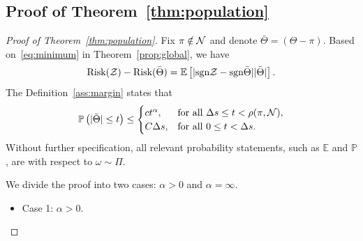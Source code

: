 \documentclass[twoside,11pt]{article}
\theoremstyle{definition}
\def\sign{\textup{sgn}}
\def\risk{\textup{Risk}}
\begin{document}
\subsection{Proof of Theorem~\ref{thm:population}}
\begin{proof}[Proof of Theorem~\ref{thm:population}]
Fix $\pi\notin\mathcal{N}$ and denote $\bar \Theta=(\Theta-\pi)$. Based on~\eqref{eq:minimum} in Theorem~\ref{prop:global}, we have
\begin{equation}\label{eq:population2}
\risk(\tZ)- \risk(\bar \Theta) = \mathbb{E}\left[|\sign \tZ-\sign\bar \Theta||\bar \Theta|\right].
\end{equation}
The Definition~\ref{ass:margin} states that
\begin{align}\label{eq:ass}
\mathbb{P}\left(|\bar \Theta | \leq t\right) \leq 
\begin{cases}ct^\alpha, & \text{for all } \Delta s \leq t< \rho(\pi,\mathcal{N}),\\
C\Delta s, & \text{for all }0\leq t< \Delta s.
\end{cases}
\end{align}
Without further specification, all relevant probability statements, such as $\mathbb{E}$ and $\mathbb{P}$, are with respect to $\omega\sim \Pi$. 

We divide the proof into two cases: $\alpha >0$ and $\alpha = \infty$.
\begin{itemize}[leftmargin=*,topsep=0pt,itemsep=-1ex,partopsep=1ex,parsep=1ex]
\item Case 1: $\alpha>0$. 


\end{itemize}
\end{proof}
\end{document}
